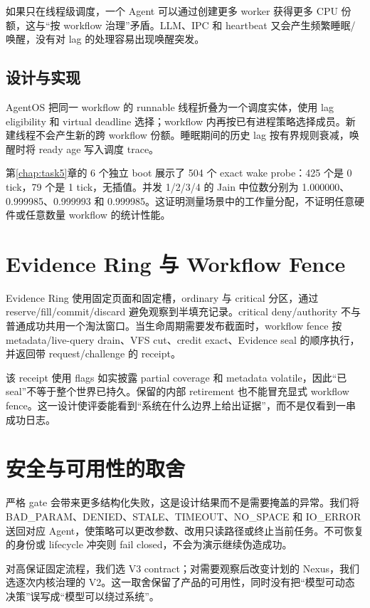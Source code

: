 如果只在线程级调度，一个 Agent 可以通过创建更多 worker 获得更多 CPU 份额，这与“按 workflow 治理”矛盾。LLM、IPC 和 heartbeat 又会产生频繁睡眠/唤醒，没有对 lag 的处理容易出现唤醒突发。

\subsection{设计与实现}

AgentOS 把同一 workflow 的 runnable 线程折叠为一个调度实体，使用 lag eligibility 和 virtual deadline 选择；workflow 内再按已有进程策略选择成员。新建线程不会产生新的跨 workflow 份额。睡眠期间的历史 lag 按有界规则衰减，唤醒时将 ready age 写入调度 trace。

第\ref{chap:task5}章的 6 个独立 boot 展示了 504 个 exact wake probe：425 个是 0 tick，79 个是 1 tick，无插值。并发 1/2/3/4 的 Jain 中位数分别为 1.000000、0.999985、0.999993 和 0.999985。这证明测量场景中的工作量分配，不证明任意硬件或任意数量 workflow 的统计性能。

\section{Evidence Ring 与 Workflow Fence}

Evidence Ring 使用固定页面和固定槽，ordinary 与 critical 分区，通过 reserve/fill/commit/discard 避免观察到半填充记录。critical deny/authority 不与普通成功共用一个淘汰窗口。当生命周期需要发布截面时，workflow fence 按 metadata/live-query drain、VFS cut、credit exact、Evidence seal 的顺序执行，并返回带 request/challenge 的 receipt。

该 receipt 使用 flags 如实披露 partial coverage 和 metadata volatile，因此“已 seal”不等于整个世界已持久。保留的内部 retirement 也不能冒充显式 workflow fence。这一设计使评委能看到“系统在什么边界上给出证据”，而不是仅看到一串成功日志。

\section{安全与可用性的取舍}

严格 gate 会带来更多结构化失败，这是设计结果而不是需要掩盖的异常。我们将 BAD\_PARAM、DENIED、STALE、TIMEOUT、NO\_SPACE 和 IO\_ERROR 送回对应 Agent，使策略可以更改参数、改用只读路径或终止当前任务。不可恢复的身份或 lifecycle 冲突则 fail closed，不会为演示继续伪造成功。

对高保证固定流程，我们选 V3 contract；对需要观察后改变计划的 Nexus，我们选逐次内核治理的 V2。这一取舍保留了产品的可用性，同时没有把“模型可动态决策”误写成“模型可以绕过系统”。
